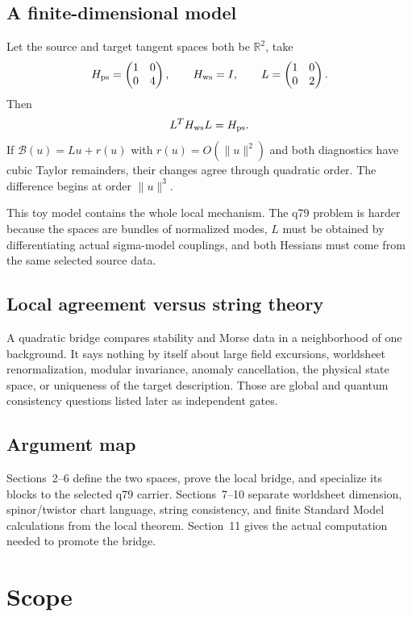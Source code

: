 \documentclass[11pt]{article}
\begin{document}
\subsection{A finite-dimensional model}

Let the source and target tangent spaces both be $\mathbb R^2$, take
\[
 H_{\rm ps}=
 \begin{pmatrix}1&0\\0&4\end{pmatrix},
 \qquad
 H_{\rm ws}=I,
 \qquad
 L=
 \begin{pmatrix}1&0\\0&2\end{pmatrix}.
\]
Then
\[
 L^{T}H_{\rm ws}L=H_{\rm ps}.
\]
If $\mathcal B(u)=Lu+r(u)$ with $r(u)=O(\|u\|^2)$ and both diagnostics have
cubic Taylor remainders, their changes agree through quadratic order.  The
difference begins at order $\|u\|^3$.

This toy model contains the whole local mechanism.  The q79 problem is harder
because the spaces are bundles of normalized modes, $L$ must be obtained by
differentiating actual sigma-model couplings, and both Hessians must come from
the same selected source data.

\subsection{Local agreement versus string theory}

A quadratic bridge compares stability and Morse data in a neighborhood of one
background.  It says nothing by itself about large field excursions,
worldsheet renormalization, modular invariance, anomaly cancellation, the
physical state space, or uniqueness of the target description.  Those are
global and quantum consistency questions listed later as independent gates.

\subsection{Argument map}

Sections~2--6 define the two spaces, prove the local bridge, and specialize its
blocks to the selected q79 carrier.  Sections~7--10 separate worldsheet
dimension, spinor/twistor chart language, string consistency, and finite
Standard Model calculations from the local theorem.  Section~11 gives the
actual computation needed to promote the bridge.

\section{Scope}
\end{document}

